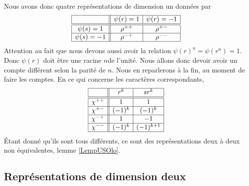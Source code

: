 Nous avons donc quatre représentations de dimension un données par
\begin{equation*}
    \begin{array}[]{|c||c|c|}
        \hline
        &\psi(r)=1&\psi(r)=-1\\
        \hline\hline
        \psi(s)=1&\rho^{++}&\rho^{+-}\\
        \hline
        \psi(s)=-1&\rho^{-+}&\rho^{--}\\
        \hline
    \end{array}
\end{equation*}
Attention au fait que nous devons aussi avoir la relation \( \psi(r)^n=\psi(r^n)=1\). Donc \( \psi(r)\) doit être une racine \( n\)\Ieme de l'unité. Nous allons donc devoir avoir un compte différent selon la parité de \( n\). Nous en reparlerons à la fin, au moment de faire les comptes. En ce qui concerne les caractères correspondants,
\begin{equation*}
    \begin{array}[]{|c||c|c|}
        \hline
        &r^k&sr^k\\
        \hline\hline
        \chi^{++}&1&1\\
        \hline
        \chi^{+-}&(-1)^k&(-1)^k\\
        \hline
        \chi^{-+}&1&-1\\
        \hline
        \chi^{--}&(-1)^k&(-1)^{k+1}\\
        \hline
    \end{array}
\end{equation*}
Étant donné qu'ils sont tous différents, ce sont des représentations deux à deux non équivalentes, lemme \ref{LempUSOlo}.

\subsection{Représentations de dimension deux}

